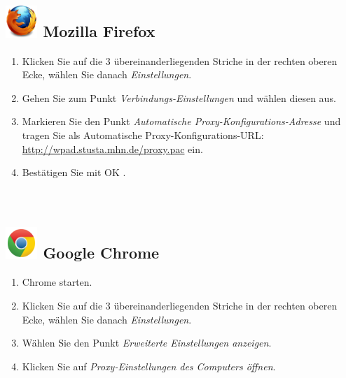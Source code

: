 \documentclass[a4paper,12pt]{scrartcl}
\begin{document}
\subsection*{\includegraphics[height=1.2cm,keepaspectratio]{Bilder/Firefox_35_logo} Mozilla Firefox}
\begin{enumerate}
	\item Klicken Sie auf die 3 übereinanderliegenden Striche in der rechten oberen Ecke, wählen Sie danach \emph{Einstellungen}.
	\item Gehen Sie zum Punkt \emph{Verbindungs-Einstellungen} und wählen diesen aus.
	\item Markieren Sie den Punkt \emph{Automatische Proxy-Konfigurations-Adresse} und tragen Sie als Automatische Proxy-Konfigurations-URL: \\ \url{http://wpad.stusta.mhn.de/proxy.pac} ein.
	\item Bestätigen Sie mit OK .\\
	\\
	\\
\end{enumerate}




\subsection*{\includegraphics[height=1.2cm,keepaspectratio]{Bilder/Chrome_2011_logo} Google Chrome}
\begin{enumerate}
	\item Chrome starten.
	\item Klicken Sie auf die 3 übereinanderliegenden Striche in der rechten oberen Ecke, wählen Sie danach \emph{Einstellungen}.
	\item Wählen Sie den Punkt \emph{Erweiterte Einstellungen anzeigen}.
	\item Klicken Sie auf \emph{Proxy-Einstellungen des Computers öffnen}.
	\\
	\\
\end{enumerate}
\end{document}
